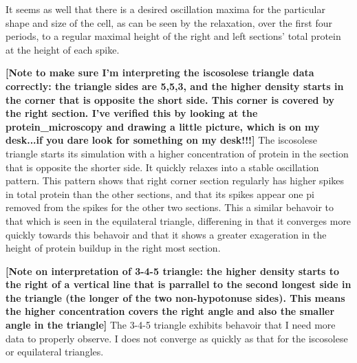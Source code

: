\documentclass[letterpaper,twocolumn,amsmath,amssymb,pre]{revtex4-1}
\newcommand{\red}[1]{{\bf \color{red} #1}}
\newcommand{\fixme}[1]{\red{[#1]}}
\begin{document}
It seems as well that there is a desired oscillation maxima for the
particular shape and size of the cell, as can be seen by the
relaxation, over the first four periods, to a regular maximal height
of the right and left sections' total protein at the height of each spike.

\fixme{Note to make sure I'm interpreting the iscosolese triangle data
  correctly: the triangle sides are 5,5,3, and the higher density
  starts in the corner that is opposite the short side.  This corner
  is covered by the right section.  I've verified this by looking at
  the protein\_microscopy and drawing a little picture, which is on my
  desk...if you dare look for something on my desk!!!}  The iscosolese
triangle starts its simulation with a higher concentration of protein
in the section that is opposite the shorter side.  It quickly relaxes
into a stable oscillation pattern.  This pattern shows that right
corner section regularly has higher spikes in total protein than the
other sections, and that its spikes appear one pi removed from the
spikes for the other two sections.  This a similar behavoir to that
which is seen in the equilateral triangle, differening in that it
converges more quickly towards this behavoir and that it shows a
greater exageration in the height of protein buildup in the right most
section.

\fixme{Note on interpretation of 3-4-5 triangle: the higher density
  starts to the right of a vertical line that is parrallel to the
  second longest side in the triangle (the longer of the two
  non-hypotonuse sides).  This means the higher concentration covers
  the right angle and also the smaller angle in the triangle} The
3-4-5 triangle exhibits behavoir that I need more data to properly
observe.  I does not converge as quickly as that for the iscosolese or
equilateral triangles.
\end{document}
